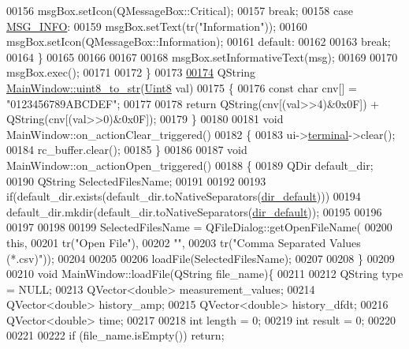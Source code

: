 \begin{DoxyCode}
00156         msgBox.setIcon(QMessageBox::Critical);
00157         \textcolor{keywordflow}{break};
00158     \textcolor{keywordflow}{case} \hyperlink{a00090_a1ddcc97224a95cec04b38b0ac866fa19}{MSG\_INFO}:
00159         msgBox.setText(tr(\textcolor{stringliteral}{"Information"}));
00160         msgBox.setIcon(QMessageBox::Information);
00161     \textcolor{keywordflow}{default}:
00162 
00163         \textcolor{keywordflow}{break};
00164     \}
00165 
00166 
00167 
00168  msgBox.setInformativeText(msg);
00169 
00170  msgBox.exec();
00171 
00172 \}
00173 
\hypertarget{a00109_source_l00174}{}\hyperlink{a00017_a8821556476f5a88c107f21d7db14e49c}{00174} QString \hyperlink{a00017_a8821556476f5a88c107f21d7db14e49c}{MainWindow::uint8\_to\_str}(\hyperlink{a00004_a979e3e23b9a449e69ab6a8a83b6042f8}{Uint8} val)
00175 \{
00176     \textcolor{keyword}{const} \textcolor{keywordtype}{char} cnv[] = \textcolor{stringliteral}{"0123456789ABCDEF"};
00177 
00178     \textcolor{keywordflow}{return} QString(cnv[(val>>4)&0x0F]) + QString(cnv[(val>>0)&0x0F]);
00179 \}
00180 
00181 \textcolor{keywordtype}{void} MainWindow::on\_actionClear\_triggered()
00182 \{
00183     ui->\hyperlink{a00080_aae71c46ea4546df5994735dee573b2dd}{terminal}->clear();
00184     rc\_buffer.clear();
00185 \}
00186 
00187 \textcolor{keywordtype}{void} MainWindow::on\_actionOpen\_triggered()
00188 \{
00189     QDir   default\_dir;
00190     QString SelectedFilesName;
00191 
00192 
00193     \textcolor{keywordflow}{if}(default\_dir.exists(default\_dir.toNativeSeparators(\hyperlink{a00017_a2e107e43aeaccaf4c9a42254f13122c8}{dir\_default})))
00194         default\_dir.mkdir(default\_dir.toNativeSeparators(\hyperlink{a00017_a2e107e43aeaccaf4c9a42254f13122c8}{dir\_default}));
00195 
00196 
00197 
00198 
00199     SelectedFilesName = QFileDialog::getOpenFileName(
00200         \textcolor{keyword}{this},
00201         tr(\textcolor{stringliteral}{"Open File"}),
00202         \textcolor{stringliteral}{""},
00203         tr(\textcolor{stringliteral}{"Comma Separated Values (*.csv)"}));
00204 
00205 
00206     loadFile(SelectedFilesName);
00207 
00208 \}
00209 
00210 \textcolor{keywordtype}{void} MainWindow::loadFile(QString file\_name)\{
00211 
00212     QString  type = NULL;
00213     QVector<double> measurement\_values;
00214     QVector<double> history\_amp;
00215     QVector<double> history\_dfdt;
00216     QVector<double> time;
00217 
00218     \textcolor{keywordtype}{int}    length = 0;
00219     \textcolor{keywordtype}{int}    result = 0;
00220 
00221 
00222     \textcolor{keywordflow}{if} (file\_name.isEmpty()) \textcolor{keywordflow}{return};

\end{DoxyCode}
